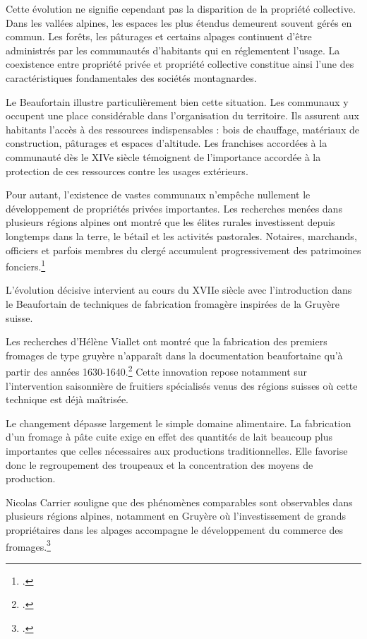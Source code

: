 \documentclass[12pt,a4paper]{report}
\begin{document}
Cette évolution ne signifie cependant pas la disparition de la propriété collective. Dans les vallées alpines, les espaces les plus étendus demeurent souvent gérés en commun. Les forêts, les pâturages et certains alpages continuent d'être administrés par les communautés d'habitants qui en réglementent l'usage. La coexistence entre propriété privée et propriété collective constitue ainsi l'une des caractéristiques fondamentales des sociétés montagnardes.

Le Beaufortain illustre particulièrement bien cette situation. Les communaux y occupent une place considérable dans l'organisation du territoire. Ils assurent aux habitants l'accès à des ressources indispensables : bois de chauffage, matériaux de construction, pâturages et espaces d'altitude. Les franchises accordées à la communauté dès le XIVe siècle témoignent de l'importance accordée à la protection de ces ressources contre les usages extérieurs.

Pour autant, l'existence de vastes communaux n'empêche nullement le développement de propriétés privées importantes. Les recherches menées dans plusieurs régions alpines ont montré que les élites rurales investissent depuis longtemps dans la terre, le bétail et les activités pastorales. Notaires, marchands, officiers et parfois membres du clergé accumulent progressivement des patrimoines fonciers.\footcite[488]{Carrier2001VieMontagnardeFaucigny}

L'évolution décisive intervient au cours du XVIIe siècle avec l'introduction dans le Beaufortain de techniques de fabrication fromagère inspirées de la Gruyère suisse.

Les recherches d'Hélène Viallet ont montré que la fabrication des premiers fromages de type gruyère n'apparaît dans la documentation beaufortaine qu'à partir des années 1630-1640.\footcite[96]{HViallet1993} Cette innovation repose notamment sur l'intervention saisonnière de fruitiers spécialisés venus des régions suisses où cette technique est déjà maîtrisée.

Le changement dépasse largement le simple domaine alimentaire. La fabrication d'un fromage à pâte cuite exige en effet des quantités de lait beaucoup plus importantes que celles nécessaires aux productions traditionnelles. Elle favorise donc le regroupement des troupeaux et la concentration des moyens de production.

Nicolas Carrier souligne que des phénomènes comparables sont observables dans plusieurs régions alpines, notamment en Gruyère où l'investissement de grands propriétaires dans les alpages accompagne le développement du commerce des fromages.\footcite[287]{CarrierMouthon2010PaysansAlpes}
\end{document}
